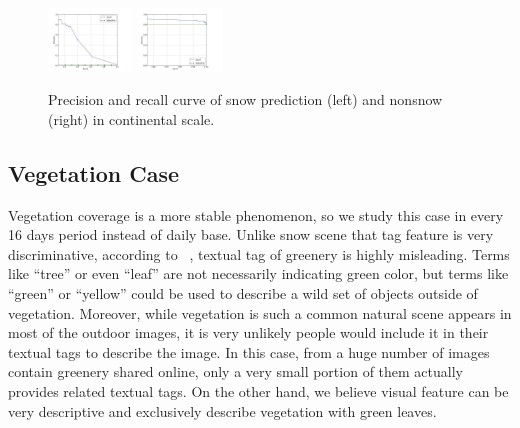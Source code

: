 \begin{figure}
\begin{center}
\includegraphics[width=0.2\textwidth,clip,trim=0.4in 0 0.8in 0]{figure/PR-snow.jpg}
\includegraphics[width=0.2\textwidth,clip,trim=0.4in 0 0.8in 0]{figure/PR-nonsnow.jpg}
\end{center}
\vspace{-12pt}
\caption{Precision and recall curve of snow prediction (left) and nonsnow (right) in continental scale.}
\label{fig:snowcurve}
\vspace{-12pt}
\end{figure}























\subsection{Vegetation Case}
Vegetation coverage is a more stable phenomenon, so we study this case in every 16 days period instead of daily base.
Unlike snow scene that 
tag feature is very discriminative, according 
to ~\cite{ecology2012www}, textual tag of greenery is highly misleading. 
Terms like ``tree'' or even ``leaf'' are not necessarily 
indicating green color, but terms like ``green'' or 
``yellow'' could be used to describe a wild set of objects outside of vegetation. Moreover, while vegetation is 
such a common natural scene appears in most of the outdoor images, it is very unlikely people would include it in their textual tags 
to describe the image. In this case, from a huge number of images contain greenery shared online, only a very small portion of them 
actually provides related textual tags. On the other hand, we believe visual feature can be very descriptive and exclusively 
describe vegetation with green leaves.



